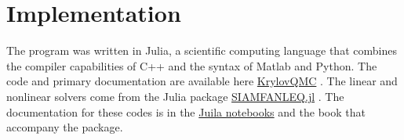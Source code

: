 \section{Implementation}
\label{sec:implementation}


The program was written in Julia, a scientific computing language that combines the compiler capabilities of C++ and the syntax of Matlab and Python. The code and primary documentation are available here \href{https://github.com/ctkelley/Krylov_QMC} {Krylov\textunderscore QMC} \cite{ctk:krylovqmc}. The linear and nonlinear solvers come from the Julia package \href{https://github.com/ctkelley/SIAMFANLEquations.jl}{SIAMFANLEQ.jl} \cite{ctk:siamfanl}. The documentation for these codes is in the \href{https://github.com/ctkelley NotebookSIAMFANL}{Juila notebooks} \cite{ctk:notebooknl} and the book \cite{ctk:fajulia} that accompany the package. 